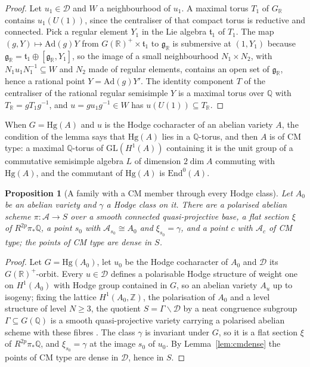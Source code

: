 \documentclass[11pt,reqno]{amsart}
\numberwithin{equation}{section}
\theoremstyle{plain}
\newtheorem{proposition}[theorem]{Proposition}
\theoremstyle{definition}
\newcommand{\QQ}{\mathbb{Q}}
\newcommand{\ZZ}{\mathbb{Z}}
\newcommand{\RR}{\mathbb{R}}
\newcommand{\Hg}{\mathrm{Hg}}
\newcommand{\End}{\mathrm{End}}
\newcommand{\cD}{\mathcal{D}}
\newcommand{\cA}{\mathcal{A}}
\begin{document}
\begin{proof}
Let $u_{1}\in\cD$ and $W$ a neighbourhood of $u_{1}$. A maximal torus $T_{1}$ of $G_{\RR}$ contains $u_{1}(U(1))$, since the centraliser of that compact torus is reductive and connected. Pick a regular element $Y_{1}$ in the Lie algebra $\mathfrak{t}_{1}$ of $T_{1}$. The map $(g,Y)\mapsto\mathrm{Ad}(g)Y$ from $G(\RR)^{+}\times\mathfrak{t}_{1}$ to $\mathfrak{g}_{\RR}$ is submersive at $(1,Y_{1})$ because $\mathfrak{g}_{\RR}=\mathfrak{t}_{1}\oplus[\mathfrak{g}_{\RR},Y_{1}]$, so the image of a small neighbourhood $N_{1}\times N_{2}$, with $N_{1}u_{1}N_{1}^{-1}\subseteq W$ and $N_{2}$ made of regular elements, contains an open set of $\mathfrak{g}_{\RR}$, hence a rational point $Y=\mathrm{Ad}(g)Y'$. The identity component $T$ of the centraliser of the rational regular semisimple $Y$ is a maximal torus over $\QQ$ with $T_{\RR}=gT_{1}g^{-1}$, and $u=gu_{1}g^{-1}\in W$ has $u(U(1))\subseteq T_{\RR}$.
\end{proof}

When $G=\Hg(A)$ and $u$ is the Hodge cocharacter of an abelian variety $A$, the condition of the lemma says that $\Hg(A)$ lies in a $\QQ$-torus, and then $A$ is of CM type: a maximal $\QQ$-torus of $\mathrm{GL}(H^{1}(A))$ containing it is the unit group of a commutative semisimple algebra $L$ of dimension $2\dim A$ commuting with $\Hg(A)$, and the commutant of $\Hg(A)$ is $\End^{0}(A)$.

\begin{proposition}[A family with a CM member through every Hodge class]\label{prop:cmfamily}
Let $A_{0}$ be an abelian variety and $\gamma$ a Hodge class on it. There are a polarised abelian scheme $\pi\colon\cA\to S$ over a smooth connected quasi-projective base, a flat section $\xi$ of $R^{2p}\pi_{*}\QQ$, a point $s_{0}$ with $\cA_{s_{0}}\cong A_{0}$ and $\xi_{s_{0}}=\gamma$, and a point $c$ with $\cA_{c}$ of CM type; the points of CM type are dense in $S$.
\end{proposition}

\begin{proof}
Let $G=\Hg(A_{0})$, let $u_{0}$ be the Hodge cocharacter of $A_{0}$ and $\cD$ its $G(\RR)^{+}$-orbit. Every $u\in\cD$ defines a polarisable Hodge structure of weight one on $H^{1}(A_{0})$ with Hodge group contained in $G$, so an abelian variety $A_{u}$ up to isogeny; fixing the lattice $H^{1}(A_{0},\ZZ)$, the polarisation of $A_{0}$ and a level structure of level $N\ge3$, the quotient $S=\Gamma\backslash\cD$ by a neat congruence subgroup $\Gamma\subseteq G(\QQ)$ is a smooth quasi-projective variety carrying a polarised abelian scheme with these fibres \cite{Mum69,Del71}. The class $\gamma$ is invariant under $G$, so it is a flat section $\xi$ of $R^{2p}\pi_{*}\QQ$, and $\xi_{s_{0}}=\gamma$ at the image $s_{0}$ of $u_{0}$. By Lemma~\ref{lem:cmdense} the points of CM type are dense in $\cD$, hence in $S$.
\end{proof}
\end{document}
